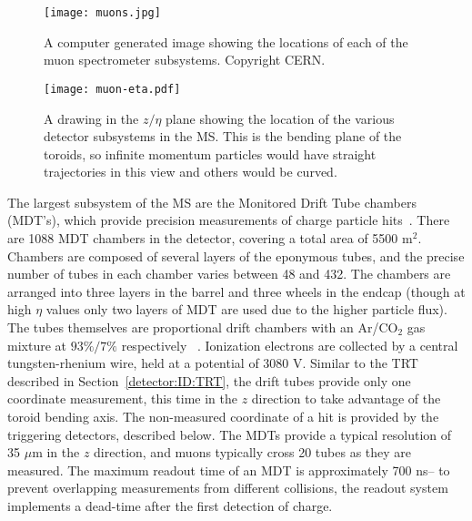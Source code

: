 
\begin{figure}
\centering
\texttt{[image: muons.jpg]}
\label{fig:detector:ms}
\caption{A computer generated image showing the locations of each of the muon spectrometer subsystems. Copyright CERN.}
\end{figure}



\begin{figure}
\centering
\texttt{[image: muon-eta.pdf]}
\label{fig:detector:ms-eta}
\caption{A drawing in the $z/\eta$ plane showing the location of the various detector subsystems in the MS. This is the bending plane of the toroids, so infinite momentum particles would have straight trajectories in this view and others would be curved.}
\end{figure}


The largest subsystem of the MS are the Monitored Drift Tube chambers (MDT's), which provide precision measurements of charge particle hits~\cite{ATLASPaper}. There are 1088 MDT chambers in the detector, covering a total area of 5500 m$^2$. Chambers are composed of several layers of the eponymous tubes, and the precise number of tubes in each chamber varies between 48 and 432. The chambers are arranged into three layers in the barrel and three wheels in the endcap (though at high $\eta$ values only two layers of MDT are used due to the higher particle flux). The tubes themselves are proportional drift chambers with an Ar/CO$_2$ gas mixture at $93\%/7\%$ respectively ~\cite{ATLASPaper,Detectors}. Ionization electrons are collected by a central tungsten-rhenium wire, held at a potential of 3080 V. Similar to the TRT described in Section~\ref{detector:ID:TRT}, the drift tubes provide only one coordinate measurement, this time in the $z$ direction to take advantage of the toroid bending axis. The non-measured coordinate of a hit is provided by the triggering detectors, described below. The MDTs provide a typical resolution of 35 $\mu$m in the $z$ direction, and muons typically cross 20 tubes as they are measured. The maximum readout time of an MDT is approximately 700 ns-- to prevent overlapping measurements from different collisions, the readout system implements a dead-time after the first detection of charge.
 
